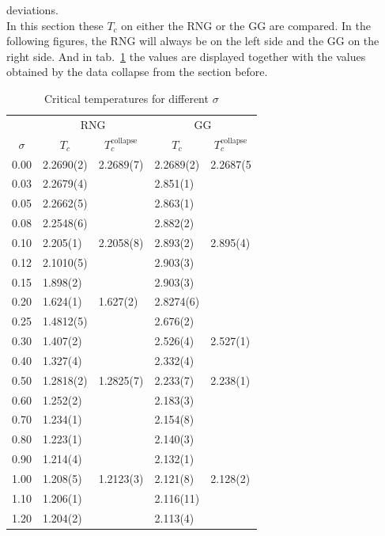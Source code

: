     deviations.\\
    In this section these \(T_c\) on either the RNG or the GG are
    compared. In the following figures, the RNG will always be on the
    left side and the GG on the right side.
    And in tab.\ \ref{tab:critTemp} the values are displayed together with the
    values obtained by the data collapse from the section before.
    \begin{table}[htbp]
        \center
        \begin{tabular}{l l l l l}
            \toprule
             & \multicolumn{2}{c}{RNG} & \multicolumn{2}{c}{GG}\\
            \cmidrule(rl){2-3} \cmidrule(rl){4-5}
            \multicolumn{1}{c}{\(\sigma\)} & \multicolumn{1}{c}{\(T_c\)} & \multicolumn{1}{c}{\(T_c^{\mathrm{collapse}}\)} & \multicolumn{1}{c}{\(T_c\)} & \multicolumn{1}{c}{\(T_c^{\mathrm{collapse}}\)}\\
            \midrule
            0.00 & 2.2690(2)& 2.2689(7)& 2.2689(2)& 2.2687(5\\
            0.03 & 2.2679(4)&          & 2.851(1) &         \\
            0.05 & 2.2662(5)&          & 2.863(1) &         \\
            0.08 & 2.2548(6)&          & 2.882(2) &         \\
            0.10 & 2.205(1) & 2.2058(8)& 2.893(2) & 2.895(4)\\
            0.12 & 2.1010(5)&          & 2.903(3) &         \\
            0.15 & 1.898(2) &          & 2.903(3) &         \\
            0.20 & 1.624(1) & 1.627(2) & 2.8274(6)&         \\
            0.25 & 1.4812(5)&          & 2.676(2) &         \\
            0.30 & 1.407(2) &          & 2.526(4) & 2.527(1)\\
            0.40 & 1.327(4) &          & 2.332(4) &         \\
            0.50 & 1.2818(2)& 1.2825(7)& 2.233(7) & 2.238(1)\\
            0.60 & 1.252(2) &          & 2.183(3) &         \\
            0.70 & 1.234(1) &          & 2.154(8) &         \\
            0.80 & 1.223(1) &          & 2.140(3) &         \\
            0.90 & 1.214(4) &          & 2.132(1) &         \\
            1.00 & 1.208(5) & 1.2123(3)& 2.121(8) & 2.128(2)\\
            1.10 & 1.206(1) &          & 2.116(11)&         \\
            1.20 & 1.204(2) &          & 2.113(4) &         \\
            \bottomrule
        \end{tabular}
        \caption[Critical Temperatures for Different $\sigma$]{Critical temperatures for different $\sigma$}
        \label{tab:critTemp}
    \end{table}\\

